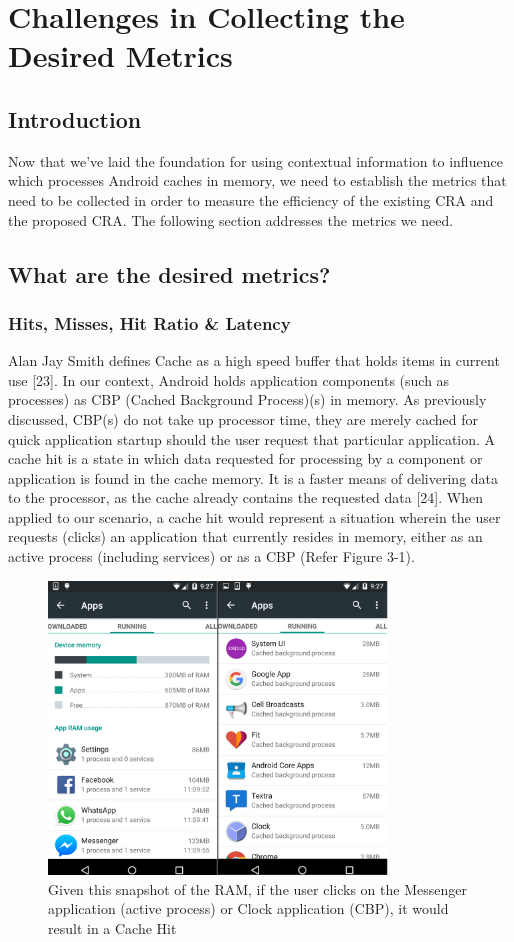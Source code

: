 \documentclass[12pt]{uthesis-v12}  %
\begin{document}
\chapter{Challenges in Collecting the Desired Metrics}
	
	\section{Introduction}
		Now that we've laid the foundation for using contextual information to influence which processes Android caches in memory, we need to establish the metrics that need to be collected in order to measure the efficiency of the existing CRA and the proposed CRA. The following section addresses the metrics we need.
	
	\section{What are the desired metrics?}
		
		\subsection{Hits, Misses, Hit Ratio \& Latency}
			Alan Jay Smith defines Cache as a high speed buffer that holds items in current use [23]. In our context, Android holds application components (such as processes) as CBP (Cached Background Process)(s) in memory. As previously discussed, CBP(s) do not take up processor time, they are merely cached for quick application startup should the user request that particular application. A cache hit is a state in which data requested for processing by a component or application is found in the cache memory. It is a faster means of delivering data to the processor, as the cache already contains the requested data [24]. When applied to our scenario, a cache hit would represent a situation wherein the user requests (clicks) an application that currently resides in memory, either as an active process (including services) or as a CBP (Refer Figure 3-1).  
			
			\begin{figure}[!ht]
				\centering
				\includegraphics[width = 90mm]{images/runningApps.png}
				\caption[Running Apps and CBP(s) - Cache Hit]
				{Given this snapshot of the RAM, if the user clicks on the Messenger application (active process) or Clock application (CBP), it would result in a Cache Hit}
			\end{figure}
			
\end{document}
